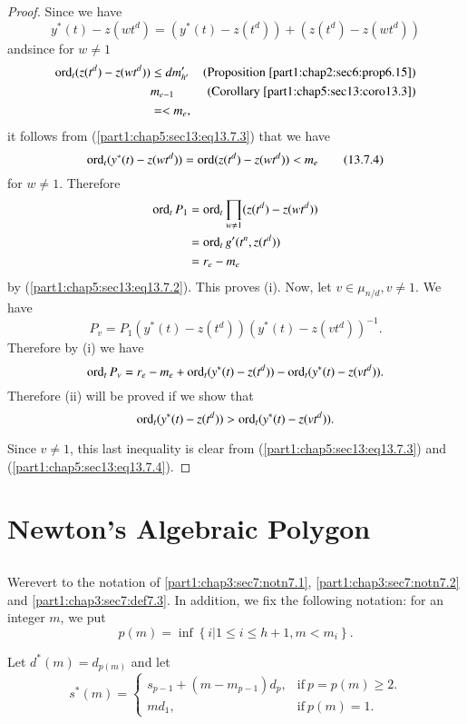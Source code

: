 \begin{proof}
Since we have
$$
y^* (t) - z(wt^d)= (y^* (t)- z(t^d)) + (z(t^d)- z(wt^d))
$$
and\pageoriginale since for $w \neq 1$
\begin{align*}
\operatorname{ord}_t (z(t^d)- z(wt^d)) & \leq d m'_{h'} & \text{(Proposition
  \ref{part1:chap2:sec6:prop6.15})}\\
& m_{e-1} & \text{(Corollary \ref{part1:chap5:sec13:coro13.3})}\\
& = < m_e,
\end{align*}
it follows from (\ref{part1:chap5:sec13:eq13.7.3}) that we have
\begin{equation*}
  \operatorname{ord}_t(y^* (t) - z(wt^d))= \operatorname{ord} (z(t^d)- z(wt^d))<
  m_e\tag{13.7.4}\label{part1:chap5:sec13:eq13.7.4}    
\end{equation*}
for $w \neq 1$. Therefore
\begin{align*}
  \operatorname{ord}_t P_1 & = \operatorname{ord}_t \prod_{w \neq 1} (z(t^d)- z(wt^d))\\
  & = \operatorname{ord}_t g' (t^n, z(t^d))\\
  & = r_e - m_e
\end{align*}
by (\ref{part1:chap5:sec13:eq13.7.2}). This proves (i). Now, let $v
\in \mu_{n/d}, v \neq 1$. We have
$$
P_v = P_1 (y^* (t)- z(t^d)) (y^* (t)- z(vt^d))^{-1}.
$$
Therefore by (i) we have
$$
\operatorname{ord}_t P_v = r_e - m_e + \operatorname{ord}_t (y^* (t) - z(t^d)) - \operatorname{ord}_t (y^*(t) -
z(vt^d)). 
$$
Therefore (ii) will be proved if we show that
$$
\operatorname{ord}_t (y^* (t) - z(t^d)) > \operatorname{ord}_t(y^* (t)- z(vt^d)).
$$

Since $v\neq 1$, this last inequality is clear from
(\ref{part1:chap5:sec13:eq13.7.3}) and (\ref{part1:chap5:sec13:eq13.7.4}).
\end{proof}

\section{Newton's Algebraic Polygon}\label{part1:chap5:sec14}  

\subsection{}\label{part1:chap5:sec14:ss14.1}

We\pageoriginale revert to the notation of
\ref{part1:chap3:sec7:notn7.1}, \ref{part1:chap3:sec7:notn7.2} and
\ref{part1:chap3:sec7:def7.3}. In addition, we fix the following
notation: for an integer $m$, we put
$$
p(m) = \inf\left\{ i \Big| 1 \leq i \leq h+1, m< m_i\right\}.
$$ 

Let $d^* (m) = d_{p(m)}$ and let 
$$
s^* (m)= 
\begin{cases}
  s_{p-1} + (m-m_{p-1})d_p, & \text{if}~ p= p(m) \geq 2.\\
  m d_1, & \text{if}~ p(m) =1.
\end{cases}
$$

